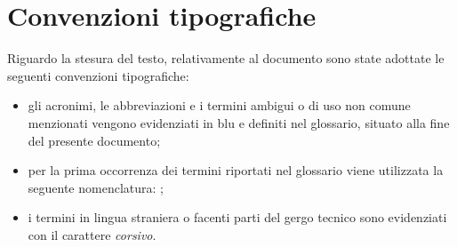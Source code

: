 \cleardoublepage
{}
\begingroup 
\let\clearpage\relax 
\let\cleardoublepage\relax 

\chapter*{Convenzioni tipografiche}
Riguardo la stesura del testo, relativamente al documento sono state adottate le seguenti convenzioni tipografiche:
\begin{itemize}
	\item gli acronimi, le abbreviazioni e i termini ambigui o di uso non comune menzionati vengono evidenziati in blu e definiti nel glossario, situato alla fine del presente documento;
	\item per la prima occorrenza dei termini riportati nel glossario viene utilizzata la seguente nomenclatura: ;
	\item i termini in lingua straniera o facenti parti del gergo tecnico sono evidenziati con il carattere \emph{corsivo}.
\end{itemize}

\endgroup
\vfill